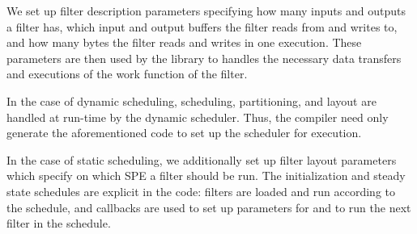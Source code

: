 We set up filter description parameters
specifying how many inputs and outputs a filter has, which input and output
buffers the filter reads from and writes to, and how many bytes the filter 
reads and writes in one execution. These parameters are then used by the
library to handles the necessary data transfers and executions of the
work function of the filter. 

In the case of dynamic scheduling, scheduling, partitioning, and layout
are handled at run-time by the dynamic scheduler. Thus, the compiler need only
generate the aforementioned code to set up the scheduler for execution.

In the case of static scheduling, we additionally set up filter layout parameters
which specify on which SPE a filter should be run. The initialization and steady state
schedules are explicit in the code: filters are loaded and run according to the
schedule, and callbacks are used to set up parameters for and to run the next filter in
the schedule.
